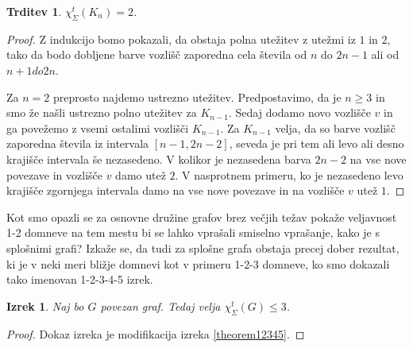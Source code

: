 \documentclass[12pt,a4paper,twoside]{article}
\theoremstyle{definition} %
\theoremstyle{plain} %
\newtheorem{izrek}[definicija]{Izrek}
\newtheorem{trditev}[definicija]{Trditev}
\newcommand{\ect}{\chi_{\Sigma}^t}
\numberwithin{equation}{section}  %
\begin{document}
\begin{trditev}
$\ect(K_n) = 2$.
\end{trditev}

\begin{proof}
Z indukcijo bomo pokazali, da obstaja polna utežitev z utežmi iz $1$ in $2$, tako da bodo dobljene barve vozlišč zaporedna cela števila od $n$ do $2n - 1$ ali od $n+1 do 2n$. 

Za $n=2$ preprosto najdemo ustrezno utežitev. Predpostavimo, da je $n \ge 3$ in smo že našli ustrezno polno utežitev za $K_{n-1}$. Sedaj dodamo novo vozlišče $v$ in ga povežemo z vsemi ostalimi vozlišči $K_{n-1}$. Za $K_{n-1}$ velja, da so barve vozlišč zaporedna števila iz intervala $[n-1, 2n - 2]$, seveda je pri tem ali levo ali desno krajišče intervala še nezasedeno. V kolikor je nezasedena barva $2n - 2$ na vse nove povezave in vozlišče $v$ damo utež $2$. V nasprotnem primeru, ko je nezasedeno levo krajišče zgornjega intervala damo na vse nove povezave in na vozlišče $v$ utež $1$.
\end{proof}

Kot smo opazli se za osnovne družine grafov brez večjih težav pokaže veljavnost 1-2 domneve na tem mestu bi se lahko vprašali smiselno vprašanje, kako je s splošnimi grafi? Izkaže se, da tudi za splošne grafa obstaja precej dober rezultat, ki je v neki meri bližje domnevi kot v primeru 1-2-3 domneve, ko smo dokazali tako imenovan 1-2-3-4-5 izrek.
\begin{izrek}
Naj bo $G$ povezan graf. Tedaj velja $\ect(G) \le 3$.
 \end{izrek}

\begin{proof}
Dokaz izreka je modifikacija izreka \ref{theorem12345}.
\end{proof}
\end{document}

